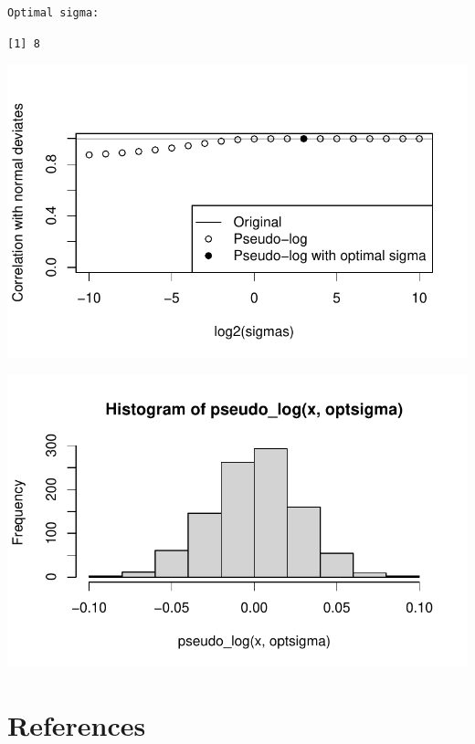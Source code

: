 \documentclass[
  letterpaper,
  DIV=11,
  numbers=noendperiod]{scrreport}
\begin{document}
\begin{verbatim}
Optimal sigma: 
\end{verbatim}

\begin{verbatim}
[1] 8
\end{verbatim}

\includegraphics{./Pseudo_log_explainer_files/figure-pdf/pl09-2.pdf}

\includegraphics{./Pseudo_log_explainer_files/figure-pdf/pl09-3.pdf}


\hypertarget{references}{%
\chapter*{References}\label{references}}

\end{document}
